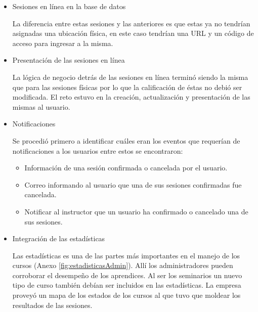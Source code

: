 \begin{itemize}

\item Sesiones en línea en la base de datos

La diferencia entre estas sesiones y las anteriores es que estas ya no tendrían asignadas una ubicación física, en este caso tendrían una \gls{URL} y un código de acceso para ingresar a la misma. 

\item Presentación de las sesiones en línea

La lógica de negocio detrás de las sesiones en línea terminó siendo la misma que para las sesiones físicas por lo que la calificación de éstas no debió ser modificada. El reto estuvo en la creación, actualización y presentación de las mismas al usuario.

\item Notificaciones

Se procedió primero a identificar cuáles eran los eventos que requerían de notificaciones a los usuarios entre estos se encontraron:

\begin{itemize}
	\item Información de una sesión confirmada o cancelada por el usuario.
	\item Correo informando al usuario que una de sus sesiones confirmadas fue cancelada.
	\item Notificar al instructor que un usuario ha confirmado o cancelado una de sus sesiones.
\end{itemize}

\item Integración de las estadísticas

Las estadísticas es una de las partes más importantes en el manejo de los cursos (Anexo \ref{fig:estadisticasAdmin}). Allí los administradores pueden corroborar el desempeño de los aprendices. Al ser los seminarios un nuevo tipo de curso también debían ser incluidos en las estadísticas. La empresa proveyó un mapa de los estados de los cursos al que tuvo que moldear los resultados de las sesiones. 

\end{itemize}


